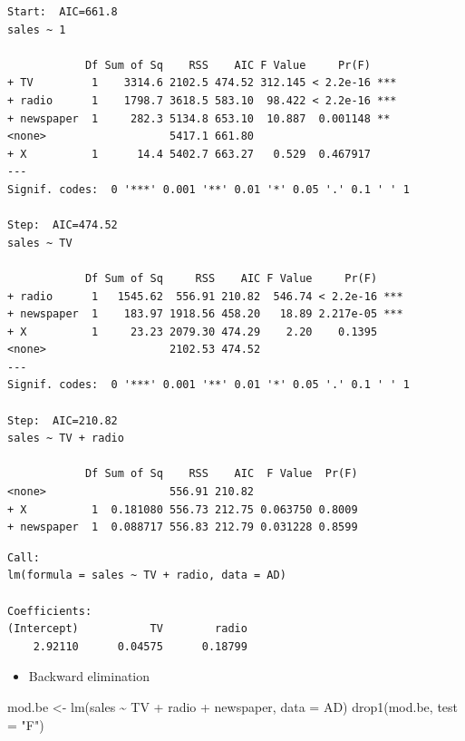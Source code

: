\documentclass[
]{article}
\newenvironment{Shaded}{\begin{snugshade}}{\end{snugshade}}
\newcommand{\AttributeTok}[1]{\textcolor[rgb]{0.77,0.63,0.00}{#1}}
\newcommand{\FunctionTok}[1]{\textcolor[rgb]{0.00,0.00,0.00}{#1}}
\newcommand{\NormalTok}[1]{#1}
\newcommand{\OtherTok}[1]{\textcolor[rgb]{0.56,0.35,0.01}{#1}}
\newcommand{\SpecialCharTok}[1]{\textcolor[rgb]{0.00,0.00,0.00}{#1}}
\newcommand{\StringTok}[1]{\textcolor[rgb]{0.31,0.60,0.02}{#1}}
\providecommand{\tightlist}{%
  \setlength{\itemsep}{0pt}\setlength{\parskip}{0pt}}
\begin{document}
\begin{verbatim}
Start:  AIC=661.8
sales ~ 1

            Df Sum of Sq    RSS    AIC F Value     Pr(F)    
+ TV         1    3314.6 2102.5 474.52 312.145 < 2.2e-16 ***
+ radio      1    1798.7 3618.5 583.10  98.422 < 2.2e-16 ***
+ newspaper  1     282.3 5134.8 653.10  10.887  0.001148 ** 
<none>                   5417.1 661.80                      
+ X          1      14.4 5402.7 663.27   0.529  0.467917    
---
Signif. codes:  0 '***' 0.001 '**' 0.01 '*' 0.05 '.' 0.1 ' ' 1

Step:  AIC=474.52
sales ~ TV

            Df Sum of Sq     RSS    AIC F Value     Pr(F)    
+ radio      1   1545.62  556.91 210.82  546.74 < 2.2e-16 ***
+ newspaper  1    183.97 1918.56 458.20   18.89 2.217e-05 ***
+ X          1     23.23 2079.30 474.29    2.20    0.1395    
<none>                   2102.53 474.52                      
---
Signif. codes:  0 '***' 0.001 '**' 0.01 '*' 0.05 '.' 0.1 ' ' 1

Step:  AIC=210.82
sales ~ TV + radio

            Df Sum of Sq    RSS    AIC  F Value  Pr(F)
<none>                   556.91 210.82                
+ X          1  0.181080 556.73 212.75 0.063750 0.8009
+ newspaper  1  0.088717 556.83 212.79 0.031228 0.8599
\end{verbatim}

\begin{verbatim}
Call:
lm(formula = sales ~ TV + radio, data = AD)

Coefficients:
(Intercept)           TV        radio  
    2.92110      0.04575      0.18799  
\end{verbatim}

\begin{itemize}
\tightlist
\item
  Backward elimination
\end{itemize}

\begin{Shaded}
\begin{Highlighting}[]
\NormalTok{mod.be }\OtherTok{\textless{}{-}} \FunctionTok{lm}\NormalTok{(sales }\SpecialCharTok{\textasciitilde{}}\NormalTok{ TV }\SpecialCharTok{+}\NormalTok{ radio }\SpecialCharTok{+}\NormalTok{ newspaper, }\AttributeTok{data =}\NormalTok{ AD)}
\FunctionTok{drop1}\NormalTok{(mod.be, }\AttributeTok{test =} \StringTok{"F"}\NormalTok{)}
\end{Highlighting}
\end{Shaded}
\end{document}
